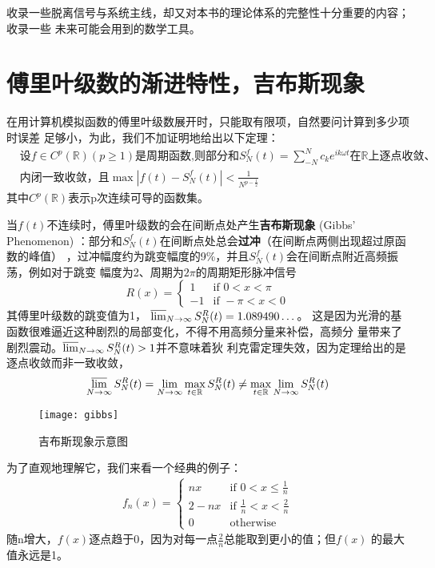\documentclass{ctexbook}
\begin{document}
收录一些脱离信号与系统主线，却又对本书的理论体系的完整性十分重要的内容；收录一些
未来可能会用到的数学工具。

\section{傅里叶级数的渐进特性，吉布斯现象}\label{sec:Asymptotic_Behaviour}

在用计算机模拟函数的傅里叶级数展开时，只能取有限项，自然要问计算到多少项时误差
足够小，为此，我们不加证明地给出以下定理：
\begin{align*}
     & \text{设}f\in C^p(\mathbb{R} )(p\geq1)\text{是周期函数,则部分和}
    S_N^f(t)=\sum_{-N}^{N}c_k e^{ik\omega t}
    \text{在}\mathbb{R} \text{上逐点收敛、}                                   \\
     & \text{内闭一致收敛，且} \max|f(t)-S_N^f(t)|<\frac{1}{N^{p-\frac{1}{2}}}
\end{align*}
其中$C^p(\mathbb{R} )$表示p次连续可导的函数集。

当$f(t)$不连续时，傅里叶级数的会在间断点处产生\textbf{吉布斯现象} (Gibbs' Phenomenon)
：部分和$S_N^f(t)$在间断点处总会\textbf{过冲}（在间断点两侧出现超过原函数的峰值）
，过冲幅度约为跳变幅度的9\%，并且$S_N^f(t)$会在间断点附近高频振荡，例如对于跳变
幅度为2、周期为$2\pi$的周期矩形脉冲信号
\[R(x) =
    \begin{cases}
        1  & \text{if } 0<x<\pi  \\
        -1 & \text{if } -\pi<x<0
    \end{cases}\]
其傅里叶级数的跳变值为1，
$\varlimsup_{N \to \infty}S_N^R(t)=1.089490 \dots$。
这是因为光滑的基函数很难逼近这种剧烈的局部变化，不得不用高频分量来补偿，高频分
量带来了剧烈震动。$\varlimsup_{N \to \infty}S_N^R(t)>1$并不意味着狄
利克雷定理失效，因为定理给出的是逐点收敛而非一致收敛，
\[\varlimsup_{N \to \infty}S_N^R(t)=\lim_{N \to \infty}\max_{t\in \mathbb{R} }S_N^R(t)\neq \max_{t\in\mathbb{R}}\lim_{N\to\infty}S_N^R(t)\]
\begin{figure}
    \centering
    \texttt{[image: gibbs]}
    \caption{吉布斯现象示意图}
\end{figure}

为了直观地理解它，我们来看一个经典的例子：
\begin{align*}
    f_n(x)=
    \begin{cases}
        nx   & \text{if } 0<x\leq\frac{1}{n}        \\
        2-nx & \text{if } \frac{1}{n}<x<\frac{2}{n} \\
        0    & \text{otherwise}
    \end{cases}
\end{align*}
随n增大，$f(x)$逐点趋于0，因为对每一点$\frac{2}{n}$总能取到更小的值；但$f(x)$
的最大值永远是1。
\end{document}
